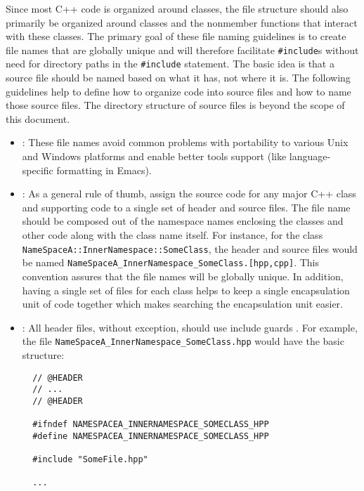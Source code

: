 Since most C++ code is organized around classes, the file structure should
also primarily be organized around classes and the nonmember functions that
interact with these classes.  The primary goal of these file naming guidelines
is to create file names that are globally unique and will therefore facilitate
{}\texttt{\#include}s without need for directory paths in the
{}\texttt{\#include} statement.  The basic idea is that a source file should
be named based on what it has, not where it is.  The following guidelines help
to define how to organize code into source files and how to name those source
files.  The directory structure of source files is beyond the scope of this
document.


\begin{itemize}


{}\item\NOSFFileExtension: These file names avoid common problems with
portability to various Unix and Windows platforms and enable better tools
support (like language-specific formatting in Emacs).


{}\item\NOSFClassFiles: As a general rule of thumb, assign the source code for
any major C++ class and supporting code to a single set of header and source
files.  The file name should be composed out of the namespace names enclosing
the classes and other code along with the class name itself.  For instance,
for the class {}\texttt{NameSpaceA\-::InnerNamespace\-::SomeClass}, the header
and source files would be named
{}\texttt{NameSpaceA\-\_InnerNamespace\-\_SomeClass.[hpp,cpp]}.  This
convention assures that the file names will be globally unique.  In addition,
having a single set of files for each class helps to keep a single
encapsulation unit of code together which makes searching the encapsulation
unit easier.


{}\item\NOSFIncludeGuards: All header files, without exception, should use
include guards {}\cite[Item 24]{C++CodingStandards05}.  For example, the file
{}\texttt{NameSpaceA\-\_InnerNamespace\-\_SomeClass.hpp} would have the basic
structure:

{\small\begin{verbatim}
  // @HEADER
  // ...
  // @HEADER

  #ifndef NAMESPACEA_INNERNAMESPACE_SOMECLASS_HPP
  #define NAMESPACEA_INNERNAMESPACE_SOMECLASS_HPP

  #include "SomeFile.hpp"

  ...


\end{verbatim}}
\end{itemize}
